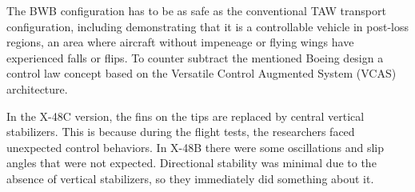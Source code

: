 %
The BWB configuration has to be as safe as the conventional TAW transport configuration, including demonstrating that it is a controllable vehicle in post-loss regions, an area where aircraft without impeneage or flying wings have experienced falls or flips. To counter subtract the mentioned Boeing design a control law concept based on the Versatile Control Augmented System (VCAS) architecture.
%
%

 
In the X-48C version, the fins on the tips are replaced by central vertical stabilizers. This is because during the flight tests, the researchers faced unexpected control behaviors. In X-48B there were some oscillations and slip angles that were not expected. Directional stability was minimal due to the absence of vertical stabilizers, so they immediately did something about it. 

